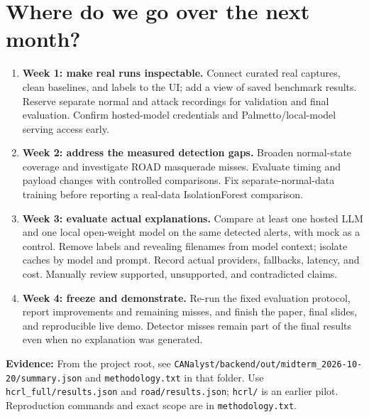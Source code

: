 \documentclass[10pt,letterpaper]{article}
\begin{document}
\section{Where do we go over the next month?}
\begin{enumerate}
\item \textbf{Week 1: make real runs inspectable.} Connect curated real captures, clean baselines, and labels to the UI; add a view of saved benchmark results. Reserve separate normal and attack recordings for validation and final evaluation. Confirm hosted-model credentials and Palmetto/local-model serving access early.
\item \textbf{Week 2: address the measured detection gaps.} Broaden normal-state coverage and investigate ROAD masquerade misses. Evaluate timing and payload changes with controlled comparisons. Fix separate-normal-data training before reporting a real-data IsolationForest comparison.
\item \textbf{Week 3: evaluate actual explanations.} Compare at least one hosted LLM and one local open-weight model on the same detected alerts, with mock as a control. Remove labels and revealing filenames from model context; isolate caches by model and prompt. Record actual providers, fallbacks, latency, and cost. Manually review supported, unsupported, and contradicted claims.
\item \textbf{Week 4: freeze and demonstrate.} Re-run the fixed evaluation protocol, report improvements and remaining misses, and finish the paper, final slides, and reproducible live demo. Detector misses remain part of the final results even when no explanation was generated.
\end{enumerate}

{\footnotesize\color{muted}\textbf{Evidence:} From the project root, see \nolinkurl{CANalyst/backend/out/midterm_2026-10-20/summary.json} and \texttt{methodology.txt} in that folder. Use \texttt{hcrl\_full/results.json} and \texttt{road/results.json}; \texttt{hcrl/} is an earlier pilot. Reproduction commands and exact scope are in \texttt{methodology.txt}.}
\end{document}
